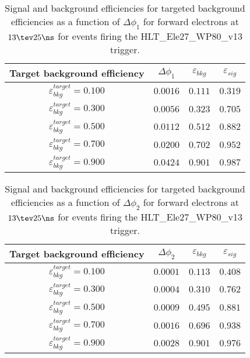 \clearpage

\begin{table}[!bht]
  \begin{center}
    \begin{tabular}{cccc}
      \hline
      Target background efficiency & $\Delta\phi_1$ & $\varepsilon_{bkg}$ & $\varepsilon_{sig}$ \\ 
      \hline
      $\varepsilon_{bkg}^{target} = 0.100$ & $  0.0016$ & $0.111$ & $0.319$ \\
      $\varepsilon_{bkg}^{target} = 0.300$ & $  0.0056$ & $0.323$ & $0.705$ \\
      $\varepsilon_{bkg}^{target} = 0.500$ & $  0.0112$ & $0.512$ & $0.882$ \\
      $\varepsilon_{bkg}^{target} = 0.700$ & $  0.0200$ & $0.702$ & $0.952$ \\
      $\varepsilon_{bkg}^{target} = 0.900$ & $  0.0424$ & $0.901$ & $0.987$ \\
      \hline
    \end{tabular}
    \caption{Signal and background efficiencies for targeted background efficiencies as a function of $\Delta\phi_1$ for forward electrons at $13\tev 25\ns$ for events firing the HLT\_Ele27\_WP80\_v13 trigger.}
    \label{tab:eff_rej_phi1_beam_13_25_trigger_27_F}
  \end{center}
\end{table}

\clearpage

\begin{table}[!bht]
  \begin{center}
    \begin{tabular}{cccc}
      \hline
      Target background efficiency & $\Delta\phi_2$ & $\varepsilon_{bkg}$ & $\varepsilon_{sig}$ \\ 
      \hline
      $\varepsilon_{bkg}^{target} = 0.100$ & $  0.0001$ & $0.113$ & $0.408$ \\
      $\varepsilon_{bkg}^{target} = 0.300$ & $  0.0004$ & $0.310$ & $0.762$ \\
      $\varepsilon_{bkg}^{target} = 0.500$ & $  0.0009$ & $0.495$ & $0.881$ \\
      $\varepsilon_{bkg}^{target} = 0.700$ & $  0.0016$ & $0.696$ & $0.938$ \\
      $\varepsilon_{bkg}^{target} = 0.900$ & $  0.0028$ & $0.901$ & $0.976$ \\
      \hline
    \end{tabular}
    \caption{Signal and background efficiencies for targeted background efficiencies as a function of $\Delta\phi_2$ for forward electrons at $13\tev 25\ns$ for events firing the HLT\_Ele27\_WP80\_v13 trigger.}
    \label{tab:eff_rej_phi2_beam_13_25_trigger_27_F}
  \end{center}
\end{table}


